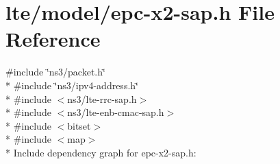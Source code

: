 \hypertarget{epc-x2-sap_8h}{}\section{lte/model/epc-\/x2-\/sap.h File Reference}
\label{epc-x2-sap_8h}
{\ttfamily \#include \char`\"{}ns3/packet.\+h\char`\"{}}\\*
{\ttfamily \#include \char`\"{}ns3/ipv4-\/address.\+h\char`\"{}}\\*
{\ttfamily \#include $<$ns3/lte-\/rrc-\/sap.\+h$>$}\\*
{\ttfamily \#include $<$ns3/lte-\/enb-\/cmac-\/sap.\+h$>$}\\*
{\ttfamily \#include $<$bitset$>$}\\*
{\ttfamily \#include $<$map$>$}\\*
Include dependency graph for epc-\/x2-\/sap.h\+:
